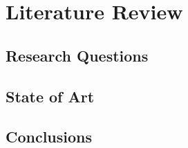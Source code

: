 % 
\chapter{Literature Review} %

%
\section{Research Questions} 

\section{State of Art}

\section{Conclusions}